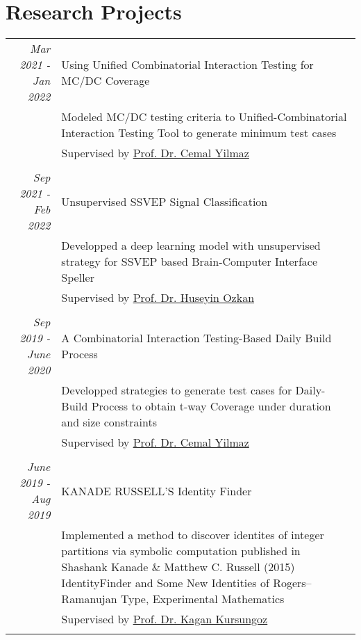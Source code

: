 \documentclass[a4paper,10pt]{article} %
\begin{document}


\section{Research Projects}

\begin{longtable}{r|p{11cm}}
\emph{Mar 2021 - Jan 2022} & Using Unified Combinatorial Interaction Testing for MC/DC Coverage\\
& \footnotesize{Modeled MC/DC testing criteria to Unified-Combinatorial Interaction Testing Tool to generate minimum test cases}\\
& \footnotesize{Supervised by \href{mailto:cyilmaz@sabanciuniv.edu}{Prof. Dr. Cemal Yilmaz}}\\
\multicolumn{2}{c}{} \\

\emph{Sep 2021 - Feb 2022} & Unsupervised SSVEP Signal Classification\\
& \footnotesize{Developped a deep learning model with unsupervised strategy for SSVEP based Brain-Computer Interface Speller}\\
& \footnotesize{Supervised by \href{mailto:hozkan@sabanciuniv.edu}{Prof. Dr. Huseyin Ozkan}}\\
\multicolumn{2}{c}{} \\

\emph{Sep 2019 - June 2020} & A Combinatorial Interaction Testing-Based Daily Build Process\\
& \footnotesize{Developped strategies to generate test cases for Daily-Build Process to obtain t-way Coverage under duration and size constraints}\\
& \footnotesize{Supervised by \href{mailto:cyilmaz@sabanciuniv.edu}{Prof. Dr. Cemal Yilmaz}}\\
\multicolumn{2}{c}{} \\

\emph{June 2019 - Aug 2019} & KANADE RUSSELL’S Identity Finder\\
& \footnotesize{Implemented a method to discover identites of integer partitions via symbolic computation  published in Shashank Kanade \& Matthew C. Russell (2015) IdentityFinder and Some New Identities of Rogers–Ramanujan Type, Experimental Mathematics}\\
& \footnotesize{Supervised by \href{mailto:kursungoz@sabanciuniv.edu }{Prof. Dr. Kagan Kursungoz}}\\
\multicolumn{2}{c}{} \\

\end{longtable}
\end{document}
